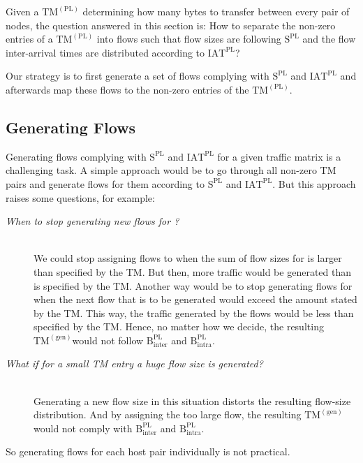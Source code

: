 \documentclass[journal,10pt]{IEEEtran}
\newcommand{\gentm}{\ensuremath{\mathrm{TM}^{(\mathrm{gen})}}}
\newcommand{\pltm}{\ensuremath{\mathrm{TM}^{(\mathrm{PL})}}}
\newcommand{\bytes}[2]{\ensuremath{\mathrm{B}^{\mathrm{#1}}_{\mathrm{#2}}}}
\newcommand{\iat}[1] {\ensuremath{\mathrm{IAT}^{\mathrm{#1}}}}
\newcommand{\size}[1]{\ensuremath{\mathrm{S}  ^{\mathrm{#1}}}}
\begin{document}
	Given a \pltm{} determining how many bytes to transfer between every pair of nodes,
	the question answered in this section is: 
	How to separate the non-zero entries of a \pltm{} into flows such that flow sizes are following \size{PL} and 
	the flow inter-arrival times are distributed according to \iat{PL}?
	
	Our strategy is to first generate a set of flows complying with \size{PL} and \iat{PL} and afterwards map these flows
	to the non-zero entries of the \pltm{}.

\subsection{Generating Flows}

Generating flows complying with \size{PL} and \iat{PL} for a given traffic matrix is a challenging task.
A simple approach would be to go through all non-zero TM pairs  and generate flows for them according to \size{PL} and \iat{PL}.
But this approach raises some questions, for example:

\begin{description}
\item[\emph{When to stop generating new flows for ?}]~\\
We could stop assigning flows to  when the sum of flow sizes for  is larger than specified by the TM. But then,
more traffic would be generated than is specified by the TM.
Another way would be to stop generating flows for  when the next flow that is to be generated would exceed the amount stated by the TM.
This way, the traffic generated by the flows would be less than specified by the TM.
Hence, no matter how we decide, the resulting \gentm would not follow \bytes{PL}{inter} and \bytes{PL}{intra}.
\item[\emph{What if for a small TM entry a huge flow size is generated?}] ~\\
Generating a new flow size in this situation distorts 
the resulting flow-size distribution.
And by assigning the too large flow, the resulting \gentm would not comply with \bytes{PL}{inter} and \bytes{PL}{intra}.
\end{description}
So generating flows for each host pair individually is not practical.
\end{document}
